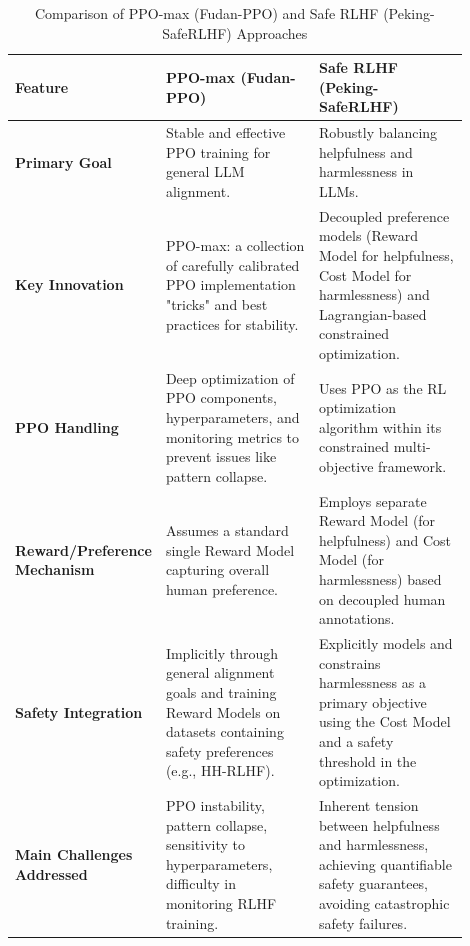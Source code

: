 \documentclass{article}
\begin{document}
\begin{table}[htbp]
  \centering
  \caption{Comparison of PPO-max (Fudan-PPO) and Safe RLHF (Peking-SafeRLHF) Approaches}
  \label{tab:comparison_fudan_peking}
  \begin{tabular}{p{0.2\linewidth} p{0.35\linewidth} p{0.35\linewidth}}
    \toprule
    \textbf{Feature} & \textbf{PPO-max (Fudan-PPO) \cite{Zheng2023PPO}} & \textbf{Safe RLHF (Peking-SafeRLHF) \cite{Dai2023SafeRLHF}} \\
    \midrule
    \textbf{Primary Goal} & Stable and effective PPO training for general LLM alignment. & Robustly balancing helpfulness and harmlessness in LLMs. \\
    \textbf{Key Innovation} & PPO-max: a collection of carefully calibrated PPO implementation "tricks" and best practices for stability. & Decoupled preference models (Reward Model for helpfulness, Cost Model for harmlessness) and Lagrangian-based constrained optimization. \\
    \textbf{PPO Handling} & Deep optimization of PPO components, hyperparameters, and monitoring metrics to prevent issues like pattern collapse. & Uses PPO as the RL optimization algorithm within its constrained multi-objective framework. \\
    \textbf{Reward/Preference Mechanism} & Assumes a standard single Reward Model capturing overall human preference. & Employs separate Reward Model (for helpfulness) and Cost Model (for harmlessness) based on decoupled human annotations. \\
    \textbf{Safety Integration} & Implicitly through general alignment goals and training Reward Models on datasets containing safety preferences (e.g., HH-RLHF). & Explicitly models and constrains harmlessness as a primary objective using the Cost Model and a safety threshold in the optimization. \\
    \textbf{Main Challenges Addressed} & PPO instability, pattern collapse, sensitivity to hyperparameters, difficulty in monitoring RLHF training. & Inherent tension between helpfulness and harmlessness, achieving quantifiable safety guarantees, avoiding catastrophic safety failures. \\
    \bottomrule
  \end{tabular}
\end{table}
\end{document}
